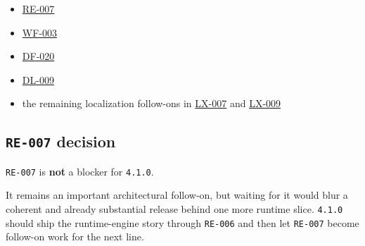 \begin{itemize}
\tightlist
\item
  \href{https://github.com/flyingrobots/bijou/blob/cbd70612140e7a450d764b3c7be1c6af878b99bc/docs/method/graveyard/legacy-backlog/up-next/RE-007-migrate-framed-shell-onto-runtime-engine-seams.md}{RE-007}
\item
  \href{https://github.com/flyingrobots/bijou/blob/cbd70612140e7a450d764b3c7be1c6af878b99bc/docs/design/WF-003-replace-smoke-examples-with-smoke-dogfood.md}{WF-003}
\item
  \href{https://github.com/flyingrobots/bijou/blob/cbd70612140e7a450d764b3c7be1c6af878b99bc/docs/method/graveyard/legacy-backlog/up-next/DF-020-deepen-dogfood-story-depth-and-variant-quality.md}{DF-020}
\item
  \href{https://github.com/flyingrobots/bijou/blob/cbd70612140e7a450d764b3c7be1c6af878b99bc/docs/method/graveyard/legacy-backlog/up-next/DL-009-formalize-layout-and-viewport-rules.md}{DL-009}
\item
  the remaining localization follow-ons in \href{https://github.com/flyingrobots/bijou/blob/cbd70612140e7a450d764b3c7be1c6af878b99bc/docs/method/graveyard/legacy-backlog/LX-007-service-oriented-localization-adapters.md}{LX-007} and \href{https://github.com/flyingrobots/bijou/blob/cbd70612140e7a450d764b3c7be1c6af878b99bc/docs/method/graveyard/legacy-backlog/LX-009-localize-shell-help-notification-and-directional-surfaces.md}{LX-009}
\end{itemize}

\subsection{\texorpdfstring{\texttt{R\allowbreak{}E\allowbreak{}-\allowbreak{}0\allowbreak{}0\allowbreak{}7} decision}{ decision}}\label{record-202-re-007-decision}

\texttt{R\allowbreak{}E\allowbreak{}-\allowbreak{}0\allowbreak{}0\allowbreak{}7} is \textbf{not} a blocker for \texttt{4\allowbreak{}.\allowbreak{}1\allowbreak{}.\allowbreak{}0}.

It remains an important architectural follow-on, but waiting for it would blur a coherent and already substantial release behind one more runtime slice. \texttt{4\allowbreak{}.\allowbreak{}1\allowbreak{}.\allowbreak{}0} should ship the runtime-engine story through \texttt{R\allowbreak{}E\allowbreak{}-\allowbreak{}0\allowbreak{}0\allowbreak{}6} and then let \texttt{R\allowbreak{}E\allowbreak{}-\allowbreak{}0\allowbreak{}0\allowbreak{}7} become follow-on work for the next line.

